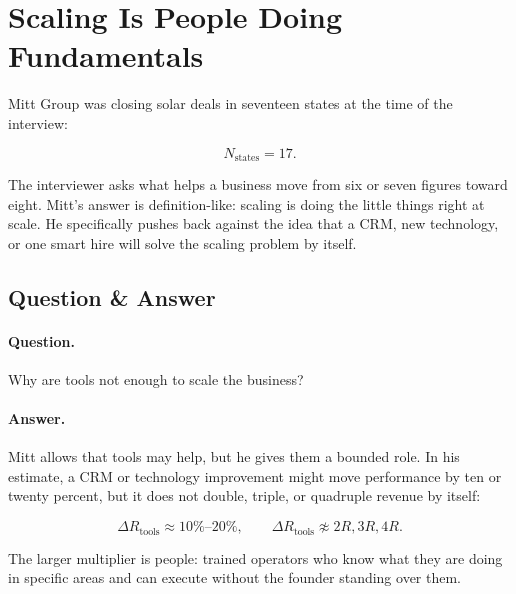 \documentclass[11pt,oneside]{book}
\begin{document}
\section{Scaling Is People Doing Fundamentals}

Mitt Group was closing solar deals in seventeen states at the time of the interview:

\begin{equation}
N_{\mathrm{states}}=17.
\end{equation}

The interviewer asks what helps a business move from six or seven figures toward eight. Mitt's answer is definition-like: scaling is doing the little things right at scale. He specifically pushes back against the idea that a CRM, new technology, or one smart hire will solve the scaling problem by itself.

\subsection{Question \& Answer}

\paragraph{Question.}
Why are tools not enough to scale the business?

\paragraph{Answer.}
Mitt allows that tools may help, but he gives them a bounded role. In his estimate, a CRM or technology improvement might move performance by ten or twenty percent, but it does not double, triple, or quadruple revenue by itself:

\begin{equation}
\Delta R_{\mathrm{tools}}\approx 10\%\text{--}20\%,
\qquad
\Delta R_{\mathrm{tools}}\not\approx 2R,3R,4R.
\end{equation}

The larger multiplier is people: trained operators who know what they are doing in specific areas and can execute without the founder standing over them.
\end{document}
